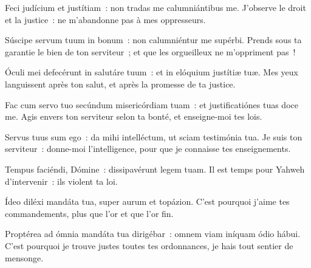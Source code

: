 \begin{paracol}{2}

\LigneParacol{0cm}
{Feci judícium et justítiam~: \GreStar{} non tradas me calumniántibus me.}
{J'observe le droit et la justice~: ne m'abandonne pas à mes oppresseurs.}

\LigneParacol{0.2cm}
{Súscipe servum tuum in bonum~: \GreStar{} non calumniéntur me supérbi.}
{Prends sous ta garantie le bien de ton serviteur~; et que les orgueilleux ne m'oppriment pas~!}

\LigneParacol{0.2cm}
{Óculi mei defecérunt in salutáre tuum~: \GreStar{} et in elóquium justítiæ tuæ.}
{Mes yeux languissent après ton salut, et après la promesse de ta justice.}

\LigneParacol{0.2cm}
{Fac cum servo tuo secúndum misericórdiam tuam~: \GreStar{} et justificatiónes tuas doce me.}
{Agis envers ton serviteur selon ta bonté, et enseigne-moi tes lois.}

\LigneParacol{0.2cm}
{Servus tuus sum ego~: \GreStar{} da mihi intelléctum, ut sciam testimónia tua.}
{Je suis ton serviteur~: donne-moi l'intelligence, pour que je connaisse tes enseignements.}

\LigneParacol{0.2cm}
{Tempus faciéndi, Dómine~: \GreStar{} dissipavérunt legem tuam.}
{Il est temps pour Yahweh d'intervenir~: ils violent ta loi.}

\LigneParacol{0.2cm}
{Ídeo diléxi mandáta tua, \GreStar{} super aurum et topázion.}
{C'est pourquoi j'aime tes commandements, plus que l'or et que l'or fin.}

\LigneParacol{0.2cm}
{Proptérea ad ómnia mandáta tua dirigébar~: \GreStar{} omnem viam iníquam ódio hábui.}
{C'est pourquoi je trouve justes toutes tes ordonnances, je hais tout sentier de mensonge.  }

\end{paracol}
